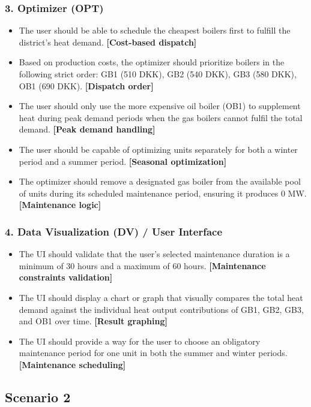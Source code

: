 \subsubsection*{3. Optimizer (OPT)}
\begin{itemize}
    \item The user should be able to schedule the cheapest boilers first to fulfill the district's heat demand. \textbf{[Cost-based dispatch]}
    \item Based on production costs, the optimizer should prioritize boilers in the following strict order: GB1 (510 DKK), GB2 (540 DKK), GB3 (580 DKK), OB1 (690 DKK). \textbf{[Dispatch order]}
    \item The user should only use the more expensive oil boiler (OB1) to supplement heat during peak demand periods when the gas boilers cannot fulfil the total demand. \textbf{[Peak demand handling]}
    \item The user should be capable of optimizing units separately for both a winter period and a summer period. \textbf{[Seasonal optimization]}
    \item The optimizer should remove a designated gas boiler from the available pool of units during its scheduled maintenance period, ensuring it produces 0 MW. \textbf{[Maintenance logic]}
\end{itemize}

\subsubsection*{4. Data Visualization (DV) / User Interface}
\begin{itemize}
    \item The UI should validate that the user's selected maintenance duration is a minimum of 30 hours and a maximum of 60 hours. \textbf{[Maintenance constraints validation]}
    \item The UI should display a chart or graph that visually compares the total heat demand against the individual heat output contributions of GB1, GB2, GB3, and OB1 over time. \textbf{[Result graphing]}
    \item The UI should provide a way for the user to choose an obligatory maintenance period for one unit in both the summer and winter periods. \textbf{[Maintenance scheduling]}
\end{itemize}

\subsection*{Scenario 2}

